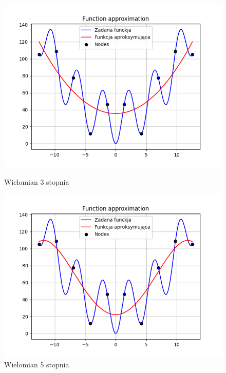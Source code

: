 \documentclass{article}
\begin{document}
\begin{figure}[H]
  \begin{minipage}[b]{0.49\textwidth}
    \begin{minipage}[b]{\textwidth}
      \includegraphics[width=\textwidth]{img02.png}
      \caption{Wielomian 3 stopnia}
    \end{minipage}
    \vspace*{\fill}
    \begin{minipage}[b]{\textwidth}
      \includegraphics[width=\textwidth]{img03.png}
      \caption{Wielomian 5 stopnia}
    \end{minipage}
  \end{minipage}
  \hfill
  \begin{minipage}[b]{0.49\textwidth}

\end{minipage}
\end{figure}
\end{document}
